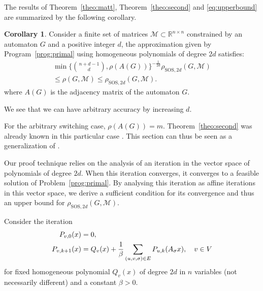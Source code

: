 \documentclass{sig-alternate-05-2015}
\newcommand{\1}{\mathbf{1}}
\theoremstyle{definition}
\newtheorem{mycor}{Corollary}
\newcommand{\A}{\mathcal{M}}
\newcommand{\G}{G}
\newcommand{\jsrsos}[1][2d]{\rho_{\mathrm{SOS},#1}(\G,\A)}
\newcommand{\cjsr}{\rho(\G,\A)}
\newcommand{\Sect}{Section~}
\newcommand{\Nodes}{V}
\newcommand{\Arcs}{E}
\newcommand{\defAGn  }{a finite set of matrices $\A \subset \mathbb{R}^{n \times n}$ constrained by an automaton $\G$}
\begin{document}
The results of Theorem~\ref{theo:matt}, Theorem~\ref{theo:second} and \eqref{eq:upperbound} are summarized by the following corollary.
\begin{mycor}
  \label{cor:mix}
  Consider \defAGn{} and a positive integer $d$,
  the approximation given by Program~\ref{prog:primal} using homogeneous polynomials of degree $2d$
  satisfies:
  \begin{multline*}
    \min\Big\{{n+d-1 \choose d}, \rho(A(\G))\Big\}^{-\frac{1}{2d}} \jsrsos\\\leq \cjsr \leq \jsrsos.
  \end{multline*}
  where $A(G)$ is the adjacency matrix of the automaton $\G$.
\end{mycor}
We see that we can have arbitrary accuracy by increasing $d$.

For the arbitrary switching case, $\rho(A(\G)) = m$.
Theorem~\ref{theo:second} was already known in this particular case \cite[Theorem~4.3]{parrilo2008approximation}.
This section can thus be seen as a generalization of \cite[\Sect4]{parrilo2008approximation}.

Our proof technique relies on the analysis of an iteration in the vector space of polynomials of degree $2d$.
When this iteration converges, it converges to a feasible solution of Problem~\ref{prog:primal}.
By analysing this iteration as affine iterations in this vector space, we derive a sufficient condition for its convergence
and thus an upper bound for $\jsrsos$.

Consider the iteration
\begin{align}
  \notag
  P_{v,0}(x) & = 0,\\
  \label{eq:iter}
  P_{v,k+1}(x) & = Q_v(x) + \frac{1}{\beta}
  \sum_{(u,v,\sigma) \in \Arcs} P_{u,k}(A_\sigma x), \quad  v \in \Nodes
\end{align}
for fixed homogeneous polynomial $Q_v(x)$ of degree $2d$ in $n$ variables (not necessarily different)
and a constant $\beta > 0$.
\end{document}

